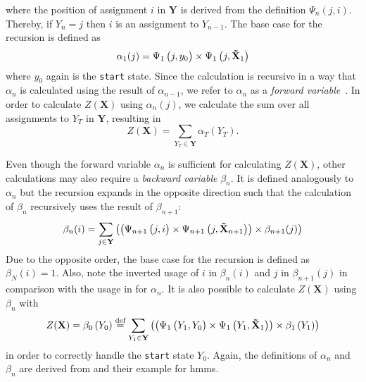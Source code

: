where the position of assignment $i$ in $\mathbf{Y}$ is derived from the definition $\Psi_n(j,i)$.
Thereby, if $Y_n=j$ then $i$ is an assignment to $Y_{n-1}$.
The base case for the recursion is defined as
\begin{equation}
  \label{equ:linear-chain-crf-z-alpha-base}
 \alpha_1(j) = \Psi_1\left(\vphantom{\tilde{X}}j,y_0\right)\times\Psi_1\left(j,\mathbf{\tilde{X}}_1\right)
\end{equation}
where $y_0$ again is the \texttt{start} state. Since the calculation is recursive in a way that $\alpha_n$ is calculated using the result of $\alpha_{n-1}$, we refer to $\alpha_n$ as a \textit{forward variable}~\citep{sutton2010introduction}. In order to calculate $Z(\mathbf{X})$ using $\alpha_n(j)$, we calculate the sum over all assignments to $Y_T$ in $\mathbf{Y}$, resulting in
\begin{equation}
  \label{equ:linear-chain-crf-z-alpha-sum}
  Z(\mathbf{X})=\sum_{Y_T\in\mathbf{Y}}\alpha_T\left(Y_T\right).
\end{equation}

\bigskip

Even though the forward variable $\alpha_n$ is sufficient for calculating $Z(\mathbf{X})$, other calculations may also require a \textit{backward variable} $\beta_n$. It is defined analogously to $\alpha_n$ but the recursion expands in the opposite direction such that the calculation of $\beta_n$ recursively uses the result of $\beta_{n+1}$:
\begin{equation}
  \label{equ:linear-chain-crf-z-beta}
  \beta_n(i) = \sum_{j\in\mathbf{Y}}\left(\left(\Psi_{n+1}\left(\vphantom{\tilde{X}}j,i\right)\times\Psi_{n+1}\left(j,\mathbf{\tilde{X}}_{n+1}\right)\right)\times \beta_{n+1}(j)\right)
\end{equation}
Due to the opposite order, the base case for the recursion is defined as $\beta_N(i)=1$.
Also, note the inverted usage of $i$ in $\beta_n(i)$ and $j$ in $\beta_{n+1}(j)$ in comparison with the usage in  for $\alpha_n$.
It is also possible to calculate $Z(\mathbf{X})$ using $\beta_n$ with
\begin{equation}
  \label{equ:linear-chain-crf-z-beta-sum}
  Z(\mathbf{X})=\beta_0\left(Y_0\right)\equalsdef\sum_{Y_1\in\mathbf{Y}}\left(\left(\Psi_1\left(\vphantom{\tilde{X}}Y_1,Y_0\right)\times\Psi_1\left(Y_1,\mathbf{\tilde{X}}_1\right)\right)\times\beta_1\left(Y_1\right)\right)
\end{equation}
in order to correctly handle the \texttt{start} state $Y_0$.
Again, the definitions of $\alpha_n$ and $\beta_n$ are derived from \citet{sutton2010introduction} and their example for \glspl{hmm}.


